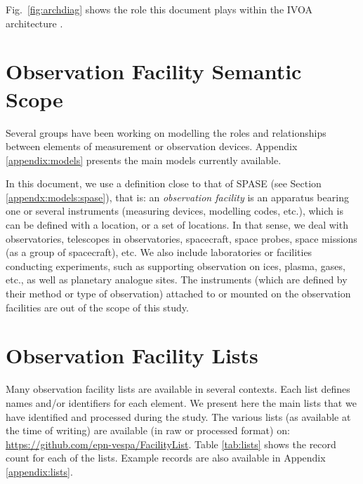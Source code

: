 \documentclass[11pt,a4paper]{ivoa}
\begin{document}
Fig.~\ref{fig:archdiag} shows the role this document plays within the
IVOA architecture \citep{2010ivoa.rept.1123A}.

\section{Observation Facility Semantic Scope}
\label{sec:scope}

Several groups have been working on modelling the roles and 
relationships between elements of measurement or observation devices. 
Appendix \ref{appendix:models} presents the main models currently 
available. 

In this document, we use a definition close to that of SPASE 
(see Section \ref{appendx:models:spase}), that is: an 
\emph{observation facility} is an apparatus bearing one or several 
instruments (measuring devices, modelling codes, etc.), which is 
can be defined with a location, or a set of locations. In that sense, we deal with observatories, 
telescopes in observatories, spacecraft, space probes, space missions 
(as a group of spacecraft), etc. We also include laboratories or 
facilities conducting  experiments, such as supporting observation on 
ices, plasma, gases, etc., as well as planetary analogue sites. The 
instruments (which are defined by their method or type of observation) 
attached to or mounted on the observation facilities are out of the scope 
of this study.


\section{Observation Facility Lists}
Many observation facility lists are available in several contexts. Each list
defines names and/or identifiers for each element. We present here the main 
lists that we have identified and processed during the study. The various 
lists (as available at the time of writing) are available (in raw or 
processed format) on: \url{https://github.com/epn-vespa/FacilityList}.
Table \ref{tab:lists} shows the record count for each of the lists. 
Example records are also available in Appendix \ref{appendix:lists}. 
\end{document}
